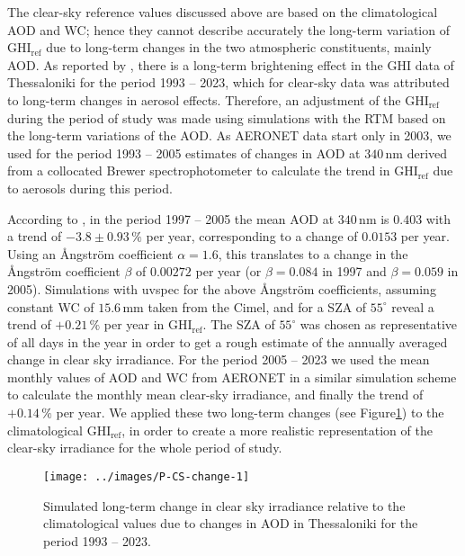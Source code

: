 \documentclass[preprint, 5p,
authoryear]{elsarticle} %
\begin{document}
The clear-sky reference values discussed above are based on the
climatological AOD and WC; hence they cannot describe accurately the
long-term variation of \(\text{GHI}_\text{ref}\) due to long-term
changes in the two atmospheric constituents, mainly AOD. As reported by
\citet{Natsis2023}, there is a long-term brightening effect in the GHI
data of Thessaloniki for the period 1993 -- 2023, which for clear-sky
data was attributed to long-term changes in aerosol effects. Therefore,
an adjustment of the \(\text{GHI}_\text{ref}\) during the period of
study was made using simulations with the RTM based on the long-term
variations of the AOD. As AERONET data start only in 2003, we used for
the period 1993 -- 2005 estimates of changes in AOD at
\(340\,\text{nm}\) derived from a collocated Brewer spectrophotometer
\citep{Kazadzis2007} to calculate the trend in \(\text{GHI}_\text{ref}\)
due to aerosols during this period.

According to \citet{Kazadzis2007}, in the period 1997 -- 2005 the mean
AOD at \(340\,\text{nm}\) is \(0.403\) with a trend of
\(-3.8\pm0.93\,\%\) per year, corresponding to a change of \(0.0153\)
per year. Using an Ångström coefficient \(\alpha = 1.6\), this
translates to a change in the Ångström coefficient \(\beta\) of
\(0.00272\) per year (or \(\beta=0.084\) in 1997 and \(\beta=0.059\) in
2005). Simulations with uvspec for the above Ångström coefficients,
assuming constant WC of \(15.6\,\text{mm}\) taken from the Cimel, and
for a SZA of \(55^\circ\) reveal a trend of \(+0.21\,\%\) per year in
\(\text{GHI}_\text{ref}\). The SZA of \(55^\circ\) was chosen as
representative of all days in the year in order to get a rough estimate
of the annually averaged change in clear sky irradiance. For the period
2005 -- 2023 we used the mean monthly values of AOD and WC from AERONET
in a similar simulation scheme to calculate the monthly mean clear-sky
irradiance, and finally the trend of \(+0.14\,\%\) per year. We applied
these two long-term changes (see
Figure\nobreakspace{}\ref{fig:CS-change}) to the climatological
\(\text{GHI}_\text{ref}\), in order to create a more realistic
representation of the clear-sky irradiance for the whole period of
study.

\begin{figure}

{\centering \texttt{[image: ../images/P-CS-change-1]} 

}

\caption{Simulated long-term change in clear sky irradiance relative to the climatological values due to changes in AOD in Thessaloniki for the period 1993 -- 2023.}\label{fig:CS-change}
\end{figure}
\end{document}

